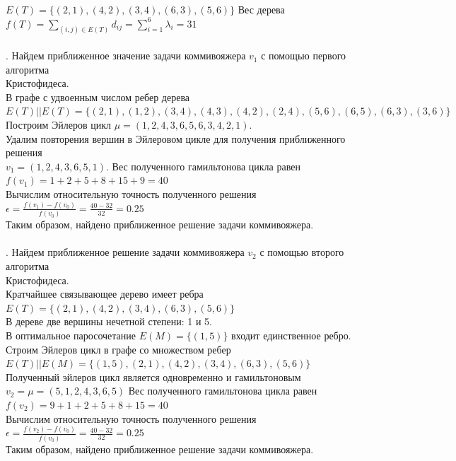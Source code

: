 \documentclass[12pt]{article}
\begin{document}
	$E(T) = \{(2, 1), (4, 2), (3, 4), (6, 3), (5, 6)\}$
	Вес дерева 
	$f(T) = \sum\limits_{(i, j) \in E(T)} d_{ij} = \sum\limits_{i = 1}^6 \lambda_{i} = 31$ \\ \\
	
	. Найдем приближенное значение задачи коммивояжера $v_1$
	с помощью первого алгоритма \\ Кристофидеса. \\
	В графе с удвоенным числом ребер дерева \\
	$E(T)||E(T) = \{(2, 1), (1, 2), (3, 4), (4, 3), (4, 2), (2, 4), (5, 6), (6, 5), (6, 3), (3, 6)\}$ \\
	Построим Эйлеров цикл $\mu = (1, 2, 4, 3, 6, 5, 6, 3, 4, 2 ,1)$. \\
	Удалим повторения вершин в Эйлеровом цикле для получения 
	приближенного решения \\
	$v_1 = (1, 2, 4, 3, 6, 5, 1)$.
	Вес полученного гамильтонова цикла равен \\
	$f(v_1) = 1 + 2 + 5 + 8 + 15 + 9 = 40$ \\
	Вычислим относительную точность полученного решения
	$\epsilon = \frac{f(v_1) - f(v_0)}{f(v_0)} = \frac{40 - 32}{32} = 0.25$ \\
	Таким образом, найдено приближенное решение задачи коммивояжера. \\ \\
	
	. Найдем приближенное решение задачи коммивояжера $v_2$ 
	с помощью второго алгоритма \\ Кристофидеса. \\
	Кратчайшее связывающее дерево имеет ребра
	$E(T) = \{(2, 1), (4, 2), (3, 4), (6, 3), (5, 6)\}$ \\
	В дереве две вершины нечетной степени: 1 и 5.
	\\ В оптимальное паросочетание $E(M) = \{(1, 5)\}$ 
	входит единственное ребро. \\
     Строим Эйлеров цикл в графе со множеством ребер \\
	$E(T) || E(M) = \{(1, 5), (2, 1), (4, 2), (3, 4), (6, 3), (5, 6)\}$ \\
	Полученный эйлеров цикл является одновременно и гамильтоновым \\
	$v_2 = \mu =  (5, 1, 2, 4, 3, 6, 5)$
	Вес полученного гамильтонова цикла равен \\
	$f(v_2) = 9 + 1 + 2 + 5 + 8 + 15 = 40$ \\
	Вычислим относительную точность полученного решения
	$\epsilon = \frac{f(v_2) - f(v_0)}{f(v_0)} = \frac{40 - 32}{32} = 0.25$ \\
	Таким образом, найдено приближенное решение задачи коммивояжера. \\ \\
\end{document}
